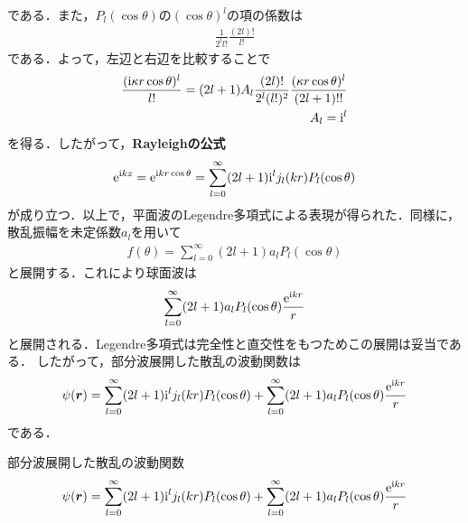 \documentclass{report}
\begin{document}
  である．また，$P_l(\cos\theta)$の$(\cos\theta)^l$の項の係数は
  \begin{align}
    \frac{1}{2^l l!}\frac{(2l)!}{l!}
  \end{align}
  である．よって，左辺と右辺を比較することで
  \begin{align}
    \frac{(\mathrm{i} \kappa r \cos\theta)^l}{l!} = (2l+1)A_l \frac{(2l)!}{2^l (l!)^2}\frac{(\kappa r \cos\theta)^l}{(2l+1)!!} \\
    A_l = \mathrm{i}^l
  \end{align}
  を得る．したがって，\textbf{Rayleighの公式}
  \begin{align}
    \mathrm{e}^{\mathrm{i} kz} = \mathrm{e}^{\mathrm{i} kr\cos\theta} = \sum_{l=0}^{\infty} (2l+1)\mathrm{i}^l j_l(kr)P_l(\cos\theta)
  \end{align}
  が成り立つ．以上で，平面波のLegendre多項式による表現が得られた．同様に，散乱振幅を未定係数$a_l$を用いて
  \begin{align}
    f(\theta) = \sum_{l=0}^{\infty} (2l+1)a_l P_l(\cos\theta)
  \end{align}
  と展開する．これにより球面波は
  \begin{align}
    \sum_{l=0}^{\infty} (2l+1)a_l P_l(\cos\theta) \frac{\mathrm{e}^{\mathrm{i} kr}}{r}
  \end{align}
  と展開される．Legendre多項式は完全性と直交性をもつためこの展開は妥当である．
  したがって，部分波展開した散乱の波動関数は
  \begin{align}
    \psi(\bm{r}) = \sum_{l = 0}^{\infty} (2l + 1)\mathrm{i}^l j_l(kr)P_l(\cos\theta) + \sum_{l = 0}^{\infty} (2l + 1)a_l P_l(\cos\theta) \frac{\mathrm{e}^{\mathrm{i} kr}}{r}
  \end{align}
  である．
  \begin{itembox}[l]{部分波展開した散乱の波動関数}
  \begin{align}
    \psi(\bm{r}) = \sum_{l = 0}^{\infty} (2l + 1)\mathrm{i}^l j_l(kr)P_l(\cos\theta) + \sum_{l = 0}^{\infty} (2l + 1)a_l P_l(\cos\theta) \frac{\mathrm{e}^{\mathrm{i} kr}}{r}\label{PartialWave}
  \end{align}
  \end{itembox}
\end{document}
